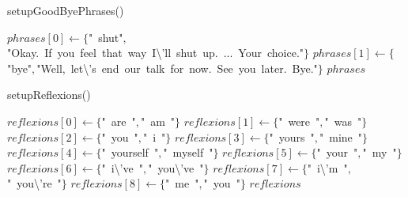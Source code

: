 \documentclass[a4paper,10pt]{article}
\begin{document}
\begin{algorithm}
\caption{setupGoodByePhrases()}
\begin{algorithmic}[5]

  \STATE \(phrases[0]\gets\{\)"{}\ shut"{}\(,\)"{}Okay.\ If\ you\ feel\ that\ way\ I\textbackslash{}'{}ll\ shut\ up.\ ...\ Your\ choice."{}\(\}\)
  \STATE \(phrases[1]\gets\{\)"{}bye"{}\(,\)"{}Well,\ let\textbackslash{}'{}s\ end\ our\ talk\ for\ now.\ See\ you\ later.\ Bye."{}\(\}\)
  \RETURN\(phrases\)

\end{algorithmic}
\end{algorithm}


\begin{algorithm}
\caption{setupReflexions()}
\begin{algorithmic}[5]

\STATE {}
\STATE {}
\STATE {}
  \STATE \(reflexions[0]\gets\{\)"{}\ are\ "{}\(,\)"{}\ am\ "{}\(\}\)
  \STATE \(reflexions[1]\gets\{\)"{}\ were\ "{}\(,\)"{}\ was\ "{}\(\}\)
  \STATE \(reflexions[2]\gets\{\)"{}\ you\ "{}\(,\)"{}\ i\ "{}\(\}\)
  \STATE \(reflexions[3]\gets\{\)"{}\ yours\ "{}\(,\)"{}\ mine\ "{}\(\}\)
  \STATE \(reflexions[4]\gets\{\)"{}\ yourself\ "{}\(,\)"{}\ myself\ "{}\(\}\)
  \STATE \(reflexions[5]\gets\{\)"{}\ your\ "{}\(,\)"{}\ my\ "{}\(\}\)
  \STATE \(reflexions[6]\gets\{\)"{}\ i\textbackslash{}'{}ve\ "{}\(,\)"{}\ you\textbackslash{}'{}ve\ "{}\(\}\)
  \STATE \(reflexions[7]\gets\{\)"{}\ i\textbackslash{}'{}m\ "{}\(,\)"{}\ you\textbackslash{}'{}re\ "{}\(\}\)
  \STATE \(reflexions[8]\gets\{\)"{}\ me\ "{}\(,\)"{}\ \textbar{}you\ "{}\(\}\)
  \RETURN\(reflexions\)

\end{algorithmic}
\end{algorithm}
\end{document}
